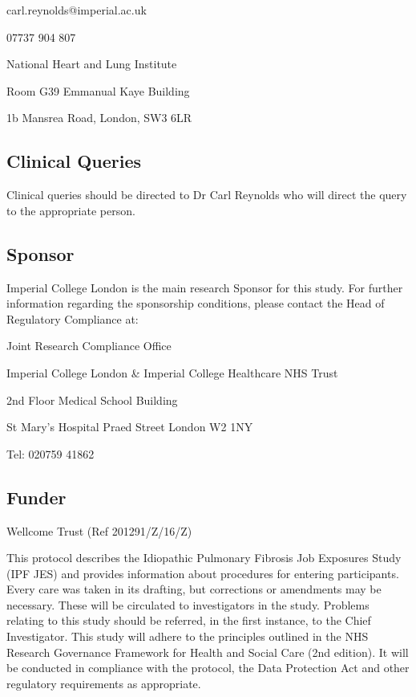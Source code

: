 \documentclass[a4paper,10pt]{article}
\begin{document}
\begin{flushleft}
carl.reynolds@imperial.ac.uk 

07737 904 807 

National Heart and Lung Institute

Room G39 Emmanual Kaye Building

1b Mansrea Road, London, SW3 6LR 


\subsection*{Clinical Queries}

Clinical queries should be directed to Dr Carl Reynolds who will direct the query to the appropriate person.

\subsection*{Sponsor}

Imperial College London is the main research Sponsor for this study. For further information regarding the sponsorship conditions, please contact the Head of Regulatory Compliance at:\vspace{0.5cm}

Joint Research Compliance Office

Imperial College London \& Imperial College Healthcare NHS Trust

2nd Floor Medical School Building

St Mary’s Hospital
Praed Street
London
W2 1NY

Tel: 020759 41862

\subsection*{Funder}


Wellcome Trust (Ref 201291/Z/16/Z) \vspace{0.5cm}

\end{flushleft}


This protocol describes the Idiopathic Pulmonary Fibrosis Job Exposures Study (IPF JES) and provides information about procedures for entering participants. Every care was taken in its drafting, but corrections or amendments may be necessary. These will be circulated to investigators in the study. Problems relating to this study should be referred, in the first instance, to the Chief Investigator. This study will adhere to the principles outlined in the NHS Research Governance Framework for Health and Social Care (2nd edition). It will be conducted in compliance with the protocol, the Data Protection Act and other regulatory requirements as appropriate. 
\end{document}
